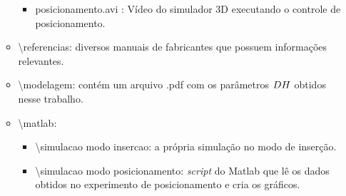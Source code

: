 \begin{itemize}
\begin{itemize}
\begin{itemize}
\item posicionamento.avi : Vídeo do simulador 3D executando o controle de
posicionamento.
\end{itemize}
\item \textbackslash{}referencias: diversos manuais de fabricantes que possuem
informações relevantes.
\item \textbackslash{}modelagem: contém um arquivo .pdf com os parâmetros
$DH$ obtidos nesse trabalho.
\item \textbackslash{}matlab: 

\begin{itemize}
\item \textbackslash{}simulacao modo insercao: a própria simulação no modo
de inserção.
\item \textbackslash{}simulacao modo posicionamento: \textit{script} do
Matlab que lê os dados obtidos no experimento de posicionamento e
cria os gráficos.\end{itemize}
\end{itemize}
\end{itemize}

